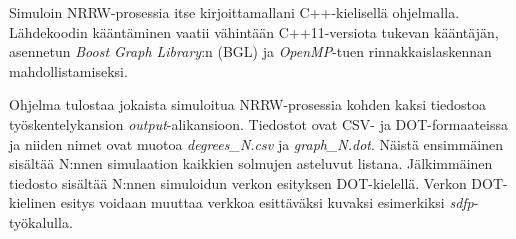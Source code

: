 \documentclass[finnish, 12pt, a4paper, sci, utf8, pdfa]{aaltothesis}
\begin{document}
Simuloin NRRW-prosessia itse kirjoittamallani C++-kielisellä ohjelmalla. Lähdekoodin kääntäminen vaatii vähintään C++11-versiota tukevan kääntäjän, asennetun \textit{Boost Graph Library}:n (BGL) ja \textit{OpenMP}-tuen rinnakkaislaskennan mahdollistamiseksi.

Ohjelma tulostaa jokaista simuloitua NRRW-prosessia kohden kaksi tiedostoa työskentelykansion \textit{output}-alikansioon. Tiedostot ovat CSV- ja DOT-formaateissa ja niiden nimet ovat muotoa \textit{degrees\_N.csv} ja \textit{graph\_N.dot}. Näistä ensimmäinen sisältää N:nnen simulaation kaikkien solmujen asteluvut listana. Jälkimmäinen tiedosto sisältää N:nnen simuloidun verkon esityksen DOT-kielellä. Verkon DOT-kielinen esitys voidaan muuttaa verkkoa esittäväksi kuvaksi esimerkiksi \textit{sdfp}-työkalulla.

\vspace{0.5cm}


\end{document}
